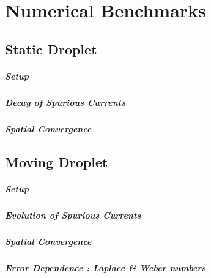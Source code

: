 \setchapterpreamble[u]{\margintoc}
\chapter{Numerical Benchmarks}


\section{Static Droplet}

\paragraph{Setup}
\blindtext

\paragraph{Decay of Spurious Currents}
\blindtext

\paragraph{Spatial Convergence}
\blindtext


\section{Moving Droplet}

\paragraph{Setup}
\blindtext

\paragraph{Evolution of Spurious Currents}
\blindtext

\paragraph{Spatial Convergence}
\blindtext

\paragraph{Error Dependence : Laplace \& Weber numbers}
\blindtext

